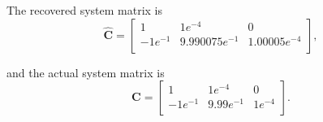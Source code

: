 \documentclass{article}
\begin{document}
The recovered system matrix is
\begin{equation}
\hat{\mathbf{C}} = 
\begin{bmatrix}
1 & 1e^{-4} & 0 \\
-1e^{-1} & 9.990075e^{-1} & 1.00005e^{-4} \\
\end{bmatrix},
\end{equation}

and the actual system matrix is
\begin{equation}
\mathbf{C} = 
\begin{bmatrix}
1 & 1e^{-4} & 0 \\
-1e^{-1} & 9.99e^{-1} & 1e^{-4} \\
\end{bmatrix}.
\end{equation}
\end{document}
